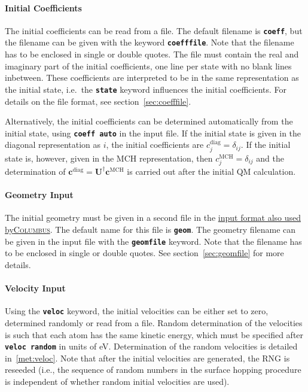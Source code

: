 \documentclass[a4paper,11pt,DIV=15,openany,twoside=false]{scrbook}
\newcommand{\ttt}[1]{\textbf{\texttt{#1}}}
\newcommand{\VEC}[1]{\ensuremath{\mathbf{#1}}}
\begin{document}
\paragraph{Initial Coefficients}

The initial coefficients can be read from a file. The default filename is \ttt{coeff}, but the filename can be given with the keyword \ttt{coefffile}. Note that the filename has to be enclosed in single or double quotes. The file must contain the real and imaginary part of the initial coefficients, one line per state with no blank lines inbetween. These coefficients are interpreted to be in the same representation as the initial state, i.e.\ the \ttt{state} keyword influences the initial coefficients. For details on the file format, see section~\ref{sec:coefffile}.

Alternatively, the initial coefficients can be determined automatically from the initial state, using \ttt{coeff auto} in the input file. If the initial state is given in the diagonal representation as $i$, the initial coefficients are $c^{\text{diag}}_j=\delta_{ij}$. If the initial state is, however, given in the MCH representation, then $c^{\text{MCH}}_j=\delta_{ij}$ and the determination of $\VEC{c}^{\text{diag}}=\VEC{U}^\dagger\VEC{c}^{\text{MCH}}$ is carried out after the initial QM calculation. 

\paragraph{Geometry Input}

The initial geometry must be given in a second file in the  \href{http://www.univie.ac.at/columbus/docs_COL70/documentation_main.html}{input format also used by\textsc{Columbus}}. The default name for this file is \ttt{geom}. The geometry filename can be given in the input file with the \ttt{geomfile} keyword. Note that the filename has to be enclosed in single or double quotes. See section~\ref{sec:geomfile} for more details.

\paragraph{Velocity Input}

Using the \ttt{veloc} keyword, the initial velocities can be either set to zero, determined randomly or read from a file. Random determination of the velocities is such that each atom has the same kinetic energy, which must be specified after \ttt{veloc random} in units of eV. Determination of the random velocities is detailed in~\ref{met:veloc}. Note that after the initial velocities are generated, the RNG is reseeded (i.e., the sequence of random numbers in the surface hopping procedure is independent of whether random initial velocities are used).
\end{document}
